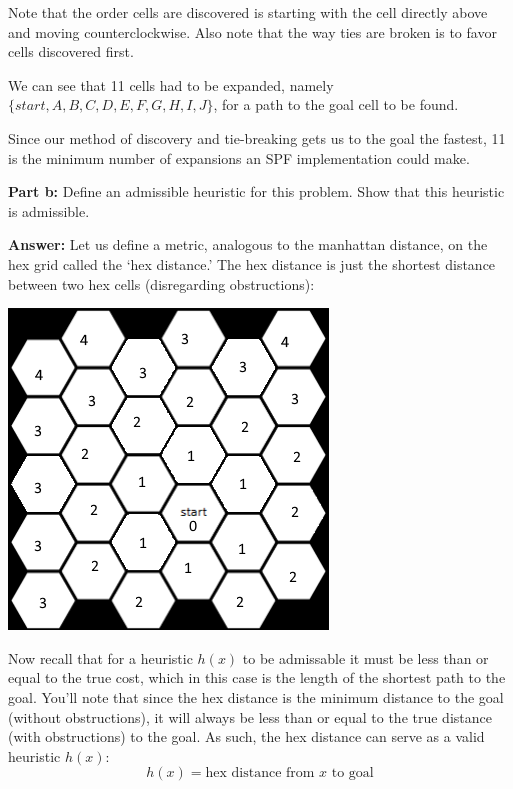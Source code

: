 \documentclass{article}
\begin{document}
Note that the order cells are discovered is starting with the cell directly above and moving counterclockwise. Also note that the way ties are broken is to favor cells discovered first.

We can see that 11 cells had to be expanded, namely $\{start,A,B,C,D,E,F,G,H,I,J\}$, for a path to the goal cell to be found.


Since our method of discovery and tie-breaking gets us to the goal the fastest, 11 is the minimum number of expansions an SPF implementation could make.
\bigskip

\newpage
\noindent\textbf{Part b:} Define an admissible heuristic for this problem. Show that this heuristic is admissible.
\bigskip

\noindent\textbf{Answer:} Let us define a metric, analogous to the manhattan distance, on the hex grid called the `hex distance.' The hex distance is just the shortest distance between two hex cells (disregarding obstructions):
\begin{center}
  \includegraphics[scale=.75]{hextilesdist.png}  
\end{center}

Now recall that for a heuristic $h(x)$ to be admissable it must be less than or equal to the true cost, which in this case is the length of the shortest path to the goal. You'll note that since the hex distance is the minimum distance to the goal (without obstructions), it will always be less than or equal to the true distance (with obstructions) to the goal. As such, the hex distance can serve as a valid heuristic $h(x)$:
$$h(x)=\text{hex distance from $x$ to goal}$$
\medskip
\end{document}
